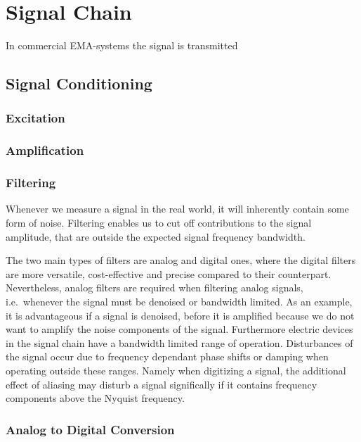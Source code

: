 \chapter{Signal Chain%
  \label{chap:\currfilebase}}


In commercial \ac{EMA}-systems the signal is transmitted
\section{Signal Conditioning}


\subsection{Excitation}

\subsection{Amplification}



\subsection{Filtering}

Whenever we measure a signal in the real world, it will inherently contain some form of noise. Filtering enables us to cut off contributions to the signal amplitude, that are outside the expected signal frequency bandwidth.

The two main types of filters are analog and digital ones, where the digital filters are more versatile, cost-effective and precise compared to their counterpart. Nevertheless, analog filters are required when filtering analog signals, i.e.\ whenever the signal must be denoised or bandwidth limited. As an example, it is advantageous if a signal is denoised, before it is amplified because we do not want to amplify the noise components of the signal. Furthermore electric devices in the signal chain have a bandwidth limited range of operation. Disturbances of the signal occur due to frequency dependant phase shifts or damping when operating outside these ranges. Namely when digitizing a signal, the additional effect of aliasing may disturb a signal significally if it contains frequency components above the Nyquist frequency.

\subsection{Analog to Digital Conversion}

